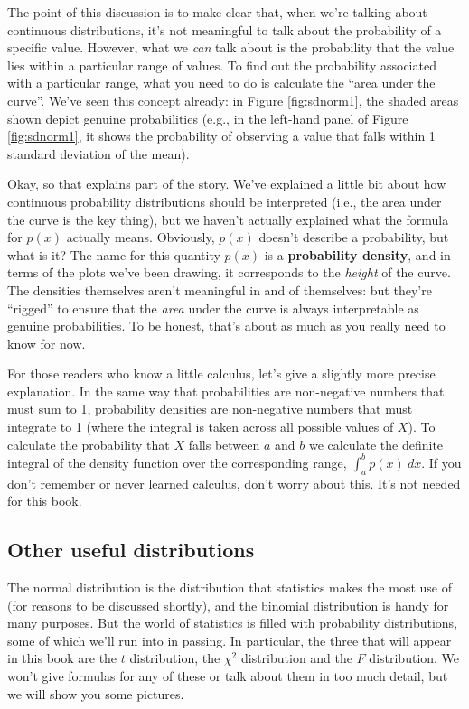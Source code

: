 \documentclass[
  11pt,
  a4paper,
  twoside,symmetric,openright]{book}
\theoremstyle{break}
\theoremstyle{break}
\begin{document}
The point of this discussion is to make clear that, when we're talking about continuous distributions, it's not meaningful to talk about the probability of a specific value. However, what we \emph{can} talk about is the probability that the value lies within a particular range of values. To find out the probability associated with a particular range, what you need to do is calculate the ``area under the curve''. We've seen this concept already: in Figure \ref{fig:sdnorm1}, the shaded areas shown depict genuine probabilities (e.g., in the left-hand panel of Figure \ref{fig:sdnorm1}, it shows the probability of observing a value that falls within 1 standard deviation of the mean).

Okay, so that explains part of the story. We've explained a little bit about how continuous probability distributions should be interpreted (i.e., the area under the curve is the key thing), but we haven't actually explained what the formula for \(p(x)\) actually means. Obviously, \(p(x)\) doesn't describe a probability, but what is it? The name for this quantity \(p(x)\) is a \textbf{probability density}, and in terms of the plots we've been drawing, it corresponds to the \emph{height} of the curve. The densities themselves aren't meaningful in and of themselves: but they're ``rigged'' to ensure that the \emph{area} under the curve is always interpretable as genuine probabilities. To be honest, that's about as much as you really need to know for now.

For those readers who know a little calculus, let's give a slightly more precise explanation. In the same way that probabilities are non-negative numbers that must sum to 1, probability densities are non-negative numbers that must integrate to 1 (where the integral is taken across all possible values of \(X\)). To calculate the probability that \(X\) falls between \(a\) and \(b\) we calculate the definite integral of the density function over the corresponding range, \(\int_a^b p(x) \ dx\). If you don't remember or never learned calculus, don't worry about this. It's not needed for this book.

\subsection{Other useful distributions}\label{otherdists}

The normal distribution is the distribution that statistics makes the most use of (for reasons to be discussed shortly), and the binomial distribution is handy for many purposes. But the world of statistics is filled with probability distributions, some of which we'll run into in passing. In particular, the three that will appear in this book are the \(t\) distribution, the \(\chi^2\) distribution and the \(F\) distribution. We won't give formulas for any of these or talk about them in too much detail, but we will show you some pictures.
\end{document}
